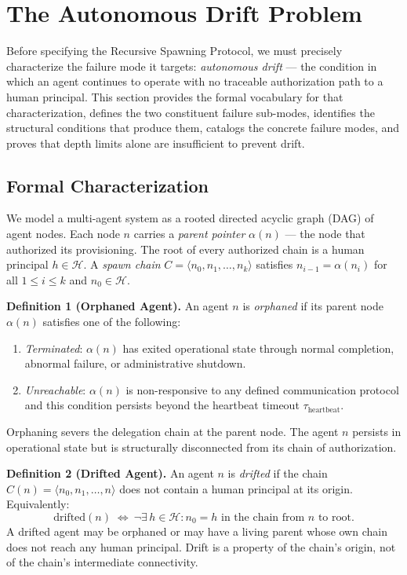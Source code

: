 \section{The Autonomous Drift Problem}
\label{sec:rs-drift}

Before specifying the Recursive Spawning Protocol, we must precisely characterize the failure mode it targets: \emph{autonomous drift} — the condition in which an agent continues to operate with no traceable authorization path to a human principal. This section provides the formal vocabulary for that characterization, defines the two constituent failure sub-modes, identifies the structural conditions that produce them, catalogs the concrete failure modes, and proves that depth limits alone are insufficient to prevent drift.

\subsection{Formal Characterization}
\label{sec:rs-drift-formal}

We model a multi-agent system as a rooted directed acyclic graph (DAG) of agent nodes. Each node $n$ carries a \emph{parent pointer} $\alpha(n)$ — the node that authorized its provisioning. The root of every authorized chain is a human principal $h \in \mathcal{H}$. A \emph{spawn chain} $C = \langle n_0, n_1, \ldots, n_k \rangle$ satisfies $n_{i-1} = \alpha(n_i)$ for all $1 \leq i \leq k$ and $n_0 \in \mathcal{H}$.

\medskip
\noindent\textbf{Definition 1 (Orphaned Agent).}
An agent $n$ is \emph{orphaned} if its parent node $\alpha(n)$ satisfies one of the following:
\begin{enumerate}
  \item[(a)] \emph{Terminated}: $\alpha(n)$ has exited operational state through normal completion, abnormal failure, or administrative shutdown.
  \item[(b)] \emph{Unreachable}: $\alpha(n)$ is non-responsive to any defined communication protocol and this condition persists beyond the heartbeat timeout $\tau_{\mathrm{heartbeat}}$.
\end{enumerate}
Orphaning severs the delegation chain at the parent node. The agent $n$ persists in operational state but is structurally disconnected from its chain of authorization.

\medskip
\noindent\textbf{Definition 2 (Drifted Agent).}
An agent $n$ is \emph{drifted} if the chain $C(n) = \langle n_0, n_1, \ldots, n \rangle$ does not contain a human principal at its origin. Equivalently:
\begin{equation}
\mathrm{drifted}(n) \;\iff\ \neg\exists\, h \in \mathcal{H} : n_0 = h \text{ in the chain from } n \text{ to root}.
\label{eq:rs-drifted-def}
\end{equation}
A drifted agent may be orphaned or may have a living parent whose own chain does not reach any human principal. Drift is a property of the chain's origin, not of the chain's intermediate connectivity.


